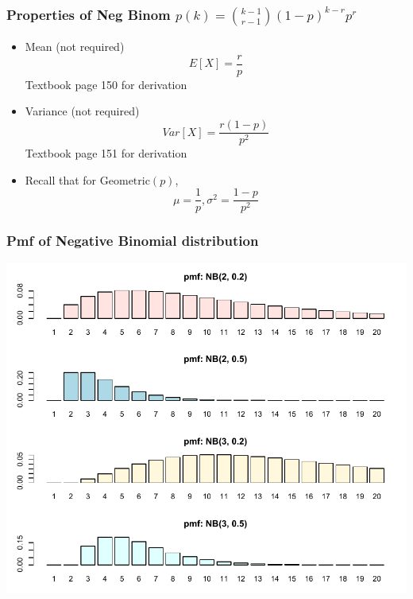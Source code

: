 \documentclass[slidestop,compress,mathserif]{beamer}
\begin{document}
\begin{frame}\frametitle{Properties of Neg Binom $p(k) = {k - 1 \choose r - 1}(1-p)^{k-r}p^{r}$}

\vfill
\begin{itemize}
\item Mean ({\color{red}not required})
\[E[X] = \frac{r}{p} \]
Textbook page 150 for derivation
\pause
\item Variance ({\color{red}not required})
\[Var[X] = \frac{r(1-p)}{p^2} \]
Textbook page 151 for derivation
\pause
\item Recall that for $\text{Geometric}(p)$,
\[ \mu = \frac{1}{p}, \sigma^2 = \frac{1-p}{p^2}\]


\end{itemize}

\end{frame}



\begin{frame}\frametitle{Pmf of Negative Binomial distribution}

\vspace{-0.5cm}
\begin{center}
\includegraphics[scale = 0.63]{figures/pmf5}
\end{center}

\end{frame}


\end{document}
